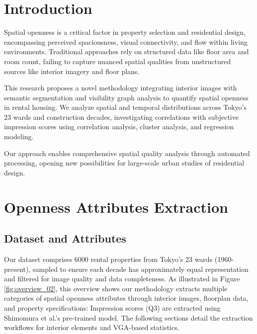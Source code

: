 \documentclass[11pt,a4paper]{article}
\begin{document}
\begin{multicols}{2}
\fontsize{11}{13}\selectfont
\vspace{1em}

\section{Introduction}

Spatial openness is a critical factor in property selection and residential design, encompassing
perceived spaciousness, visual connectivity, and flow within living environments. Traditional
approaches rely on structured data like floor area and room count, failing to capture nuanced
spatial qualities from unstructured sources like interior imagery and floor plans.

This research proposes a novel methodology integrating interior images with semantic segmentation
and visibility graph analysis to quantify spatial openness in rental housing. We analyze spatial
and temporal distributions across Tokyo's 23 wards and construction decades, investigating
correlations with subjective impression scores using correlation analysis, cluster analysis,
and regression modeling.

Our approach enables comprehensive spatial quality analysis through automated processing,
opening new possibilities for large-scale urban studies of residential design.
\vspace{1em}

\section{Openness Attributes Extraction}

\subsection{Dataset and Attributes}

Our dataset comprises 6000 rental properties from Tokyo's 23 wards (1960-present), 
sampled to ensure each decade has approximately equal representation and filtered for image quality and data completeness.
As illustrated in Figure \ref{fig:overview_02}, this overview shows our methodology extracts multiple categories of spatial openness 
attributes through interior images, floorplan data, and property specifications:
Impression scores (Q3) are extracted using Shimomura et al.'s pre-trained model.
The following sections detail the extraction workflows for interior elements and VGA-based statistics.



\end{multicols}
\end{document}
